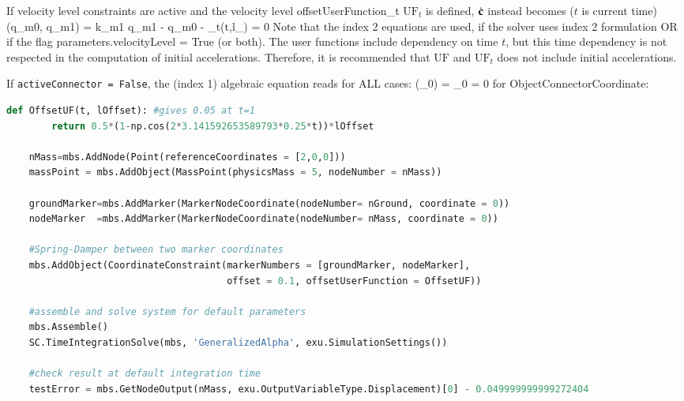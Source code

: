     If velocity level constraints are active and the velocity level offsetUserFunction\_t $\mathrm{UF}_t$ is defined, $\dot {\mathbf{c}}$ instead becomes ($t$ is current time)
    \be
      \dot \cv(\dot q_{m0}, \dot q_{m1}) = k_{m1} \cdot \dot q_{m1} - \dot q_{m0} - _t(t,l_) = 0
    \ee
    Note that the index 2 equations are used, if the solver uses index 2 formulation OR if the flag parameters.velocityLevel = True (or both).
    The user functions include dependency on time $t$, but this time dependency is not respected in the computation of initial accelerations. Therefore,
    it is recommended that $\mathrm{UF}$ and $\mathrm{UF}_t$ does not include initial accelerations.

    If \texttt{activeConnector = False}, the (index 1) algebraic equation reads for ALL cases:
    \be
      \cv(\lambda_0) = \lambda_0 = 0
    \ee
{} for ObjectConnectorCoordinate:
\pythonstyle
\begin{lstlisting}[language=Python, firstnumber=1]
    def OffsetUF(t, lOffset): #gives 0.05 at t=1
        return 0.5*(1-np.cos(2*3.141592653589793*0.25*t))*lOffset

    nMass=mbs.AddNode(Point(referenceCoordinates = [2,0,0]))
    massPoint = mbs.AddObject(MassPoint(physicsMass = 5, nodeNumber = nMass))
    
    groundMarker=mbs.AddMarker(MarkerNodeCoordinate(nodeNumber= nGround, coordinate = 0))
    nodeMarker  =mbs.AddMarker(MarkerNodeCoordinate(nodeNumber= nMass, coordinate = 0))
    
    #Spring-Damper between two marker coordinates
    mbs.AddObject(CoordinateConstraint(markerNumbers = [groundMarker, nodeMarker], 
                                       offset = 0.1, offsetUserFunction = OffsetUF)) 

    #assemble and solve system for default parameters
    mbs.Assemble()
    SC.TimeIntegrationSolve(mbs, 'GeneralizedAlpha', exu.SimulationSettings())

    #check result at default integration time
    testError = mbs.GetNodeOutput(nMass, exu.OutputVariableType.Displacement)[0] - 0.049999999999272404

\end{lstlisting}

\newpage

